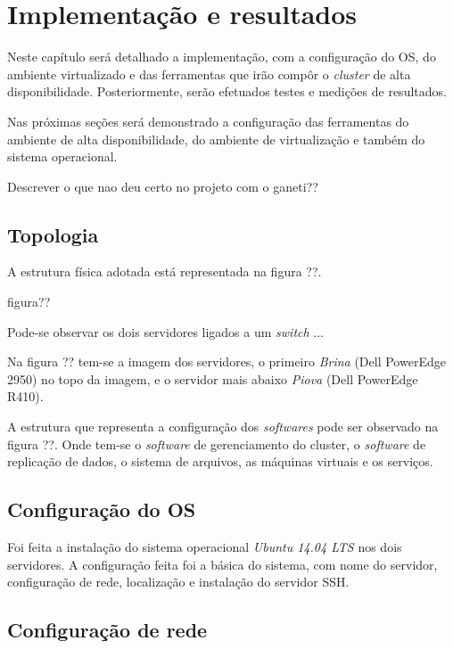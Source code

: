 \chapter{Implementação e resultados}
\label{cap:implementacaoresultados}

Neste capítulo será detalhado a implementação, com a configuração do \ac{OS}, do ambiente virtualizado e das ferramentas que irão compôr o
\textit{cluster} de alta disponibilidade. Posteriormente, serão efetuados testes e medições de resultados.

Nas próximas seções será demonstrado a configuração das ferramentas do ambiente de alta disponibilidade, do ambiente de virtualização e 
também do sistema operacional.

Descrever o que nao deu certo no projeto com o ganeti??

\section{Topologia}

A estrutura física adotada está representada na figura ??.

figura?? %

Pode-se observar os dois servidores ligados a um \textit{switch} ...

Na figura ?? tem-se a imagem dos servidores, o primeiro \textit{Brina} (Dell PowerEdge 2950) no topo da imagem, e o servidor mais abaixo 
\textit{Piova} (Dell PowerEdge R410).

A estrutura que representa a configuração dos \textit{softwares} pode ser observado na figura ??. Onde tem-se o \textit{software} de gerenciamento
do cluster, o \textit{software} de replicação de dados, o sistema de arquivos, as máquinas virtuais e os serviços.

\section{Configuração do \ac{OS}}

Foi feita a instalação do sistema operacional \textit{Ubuntu 14.04 \ac{LTS}} nos dois servidores. A configuração feita foi a básica do sistema,
com nome do servidor, configuração de rede, localização e instalação do servidor \ac{SSH}.


\section{Configuração de rede}


